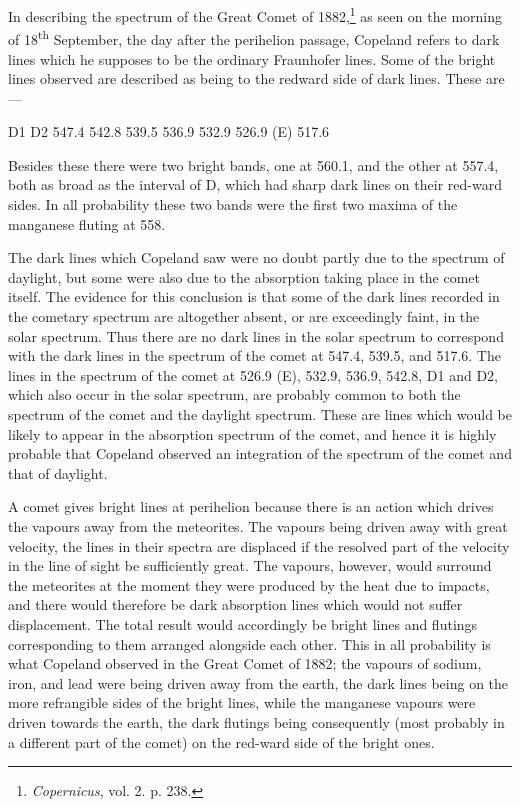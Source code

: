 \documentclass[a4paper, 12pt, oneside, polutonikogreek, english]{article}
\begin{document}
In describing the spectrum of the Great Comet of 1882,\footnote{\emph{Copernicus}, vol. 2. p. 238.} as seen on the morning of 18\textsuperscript{th} September, the day after the perihelion passage, Copeland refers to dark lines which he supposes to be the ordinary Fraunhofer lines. Some of the bright lines observed are described as being to the redward side of dark lines. These are ---

D1 
D2 
547.4 
542.8 
539.5 
536.9 
532.9 
526.9 (E) 
517.6

Besides these there were two bright bands, one at 560.1, and the other at 557.4, both as broad as the interval of D, which had sharp dark lines on their red-ward sides. In all probability these two bands were the first two maxima of the manganese fluting at 558.

The dark lines which Copeland saw were no doubt partly due to the spectrum of daylight, but some were also due to the absorption taking place in the comet itself. The evidence for this conclusion is that some of the dark lines recorded in the cometary spectrum are altogether absent, or are exceedingly faint, in the solar spectrum. Thus there are no dark lines in the solar spectrum to correspond with the dark lines in the spectrum of the comet at 547.4, 539.5, and 517.6. The lines in the spectrum of the comet at 526.9 (E), 532.9, 536.9, 542.8, D1 and D2, which also occur in the solar spectrum, are probably common to both the spectrum of the comet and the daylight spectrum. These are lines which would be likely to appear in the absorption spectrum of the comet, and hence it is highly probable that Copeland observed an integration of the spectrum of the comet and that of daylight.

A comet gives bright lines at perihelion because there is an action which drives the vapours away from the meteorites. The vapours being driven away with great velocity, the lines in their spectra are displaced if the resolved part of the velocity in the line of sight be sufficiently great. The vapours, however, would surround the meteorites at the moment they were produced by the heat due to impacts, and there would therefore be dark absorption lines which would not suffer displacement. The total result would accordingly be bright lines and flutings corresponding to them arranged alongside each other. This in all probability is what Copeland observed in the Great Comet of 1882; the vapours of sodium, iron, and lead were being driven away from the earth, the dark lines being on the more refrangible sides of the bright lines, while the manganese vapours were driven towards the earth, the dark flutings being consequently (most probably in a different part of the comet) on the red-ward side of the bright ones.
\end{document}

